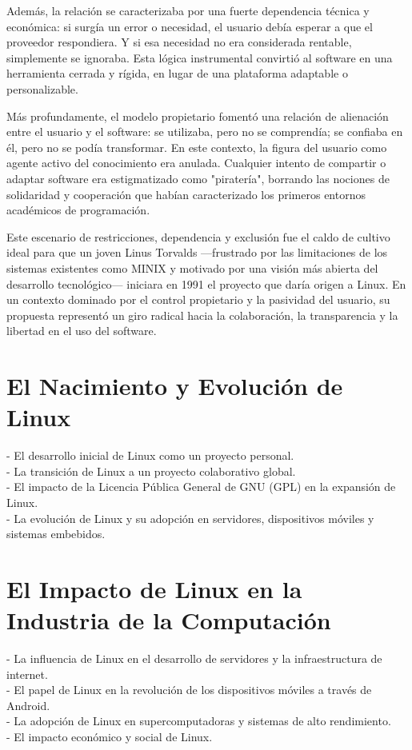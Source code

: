 \documentclass[a4paper,12pt]{article}
\begin{document}
Además, la relación se caracterizaba por una fuerte dependencia técnica y
económica: si surgía un error o necesidad, el usuario debía esperar a que el
proveedor respondiera. Y si esa necesidad no era considerada rentable,
simplemente se ignoraba. Esta lógica instrumental convirtió al software en una
herramienta cerrada y rígida, en lugar de una plataforma adaptable o
personalizable.

Más profundamente, el modelo propietario fomentó una relación de alienación
entre el usuario y el software: se utilizaba, pero no se comprendía; se confiaba
en él, pero no se podía transformar. En este contexto, la figura del usuario
como agente activo del conocimiento era anulada. Cualquier intento de compartir
o adaptar software era estigmatizado como "piratería", borrando las nociones de
solidaridad y cooperación que habían caracterizado los primeros entornos
académicos de programación.

Este escenario de restricciones, dependencia y exclusión fue el caldo de cultivo
ideal para que un joven Linus Torvalds —frustrado por las limitaciones de los
sistemas existentes como MINIX y motivado por una visión más abierta del
desarrollo tecnológico— iniciara en 1991 el proyecto que daría origen a Linux.
En un contexto dominado por el control propietario y la pasividad del usuario,
su propuesta representó un giro radical hacia la colaboración, la transparencia
y la libertad en el uso del software.

\section{El Nacimiento y Evolución de Linux} 
- El desarrollo inicial de Linux
como un proyecto personal.\\ 
- La transición de Linux a un proyecto colaborativo
global.\\ 
- El impacto de la Licencia Pública General de GNU (GPL) en la
expansión de Linux.\\ 
- La evolución de Linux y su adopción en servidores,
dispositivos móviles y sistemas embebidos.

\section{El Impacto de Linux en la Industria de la Computación} 
- La influencia
de Linux en el desarrollo de servidores y la infraestructura de internet.\\ 
- El
papel de Linux en la revolución de los dispositivos móviles a través de
Android.\\ 
- La adopción de Linux en supercomputadoras y sistemas de alto
rendimiento.\\ 
- El impacto económico y social de Linux.
\end{document}
